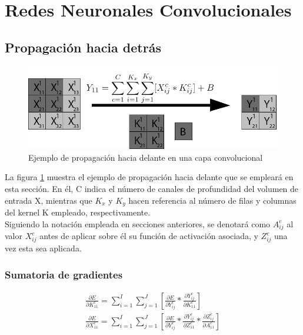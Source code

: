 \section{Redes Neuronales Convolucionales}

\subsection{Propagación hacia detrás}

\begin{figure}[H]
	\centering
	\includegraphics[width=0.8\linewidth]{imagenes/conv_ejemplo_backprop_1.jpg} 
	\caption{Ejemplo de propagación hacia delante en una capa convolucional}
	\label{fig:ejemplo_forward_prop_convolucional}
\end{figure}

La figura \ref{fig:ejemplo_forward_prop_convolucional} muestra el ejemplo de propagación hacia delante que se empleará en esta sección. En él, C indica el número de canales de profundidad del volumen de entrada X, mientras que $K_x$ y $K_y$ hacen referencia al número de filas y columnas del kernel K empleado, respectivamente. \\
Siguiendo la notación empleada en secciones anteriores, se denotará como $A^c_{ij}$ al valor $X^c_{ij}$ antes de aplicar sobre él su función de activación asociada, y $Z^c_{ij}$ una vez esta sea aplicada.

\subsubsection{Sumatoria de gradientes}

\begin{gather}
	\frac{\partial E}{\partial K^c_{11}} = \sum_{i=1}^{I}\sum_{j=1}^{J}  [\frac{\partial E}{\partial Y^c_{ij}} * \frac{\partial Y^c_{ij}}{\partial K^c_{11}}] \\
	\frac{\partial E}{\partial X^c_{11}} = \sum_{i=1}^{I}\sum_{j=1}^{J}  [\frac{\partial E}{\partial Y^c_{ij}} * \frac{\partial Y^c_{ij}}{\partial Z^c_{11}} * \frac{\partial Z^c_{ij}}{\partial A^c_{11}}] 
\end{gather}

